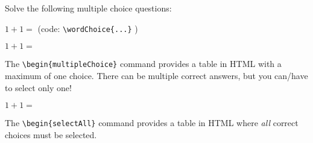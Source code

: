 \documentclass{ximera}
\begin{document}
\begin{exercise}
       Solve the following multiple choice questions:
    \begin{question}
        $1+1 = $
        \hspace{2cm} (code:  \verb|\wordChoice{...}| )

    \end{question}
    \begin{question}
        $1+1 = $\begin{multipleChoice} \end{multipleChoice}

        The \verb|\begin{multipleChoice}| command provides a table in HTML with a maximum of one choice. There can be multiple correct answers, but you can/have to select only one!

    \end{question}
    \begin{question} 
        $1+1 = $\begin{selectAll} \end{selectAll}

        The \verb|\begin{selectAll}| command provides a table in HTML where \textit{all} correct choices must be selected.    
    \end{question}

\end{exercise}
\end{document}
